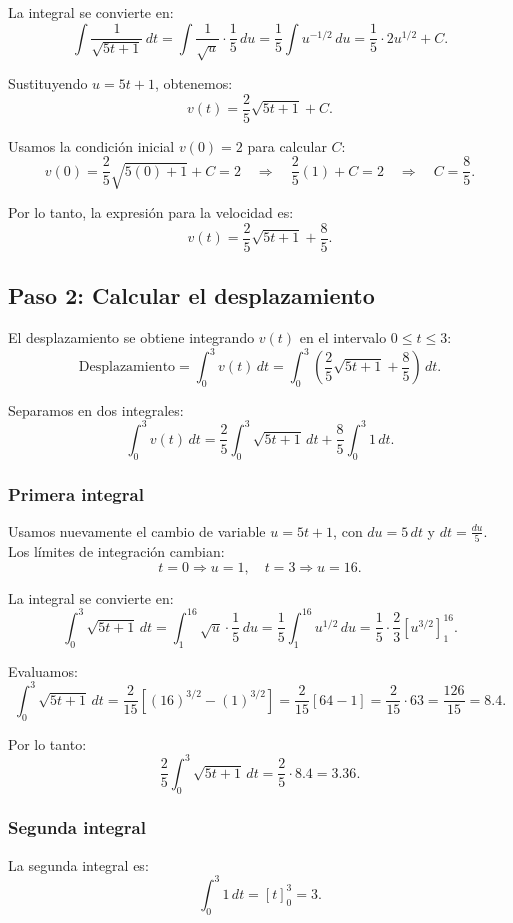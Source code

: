 \documentclass[11pt,letterpaper]{article}
\begin{document}
La integral se convierte en:
\[
\int \frac{1}{\sqrt{5t + 1}} \, dt = \int \frac{1}{\sqrt{u}} \cdot \frac{1}{5} \, du = \frac{1}{5} \int u^{-1/2} \, du = \frac{1}{5} \cdot 2u^{1/2} + C.
\]

Sustituyendo \(u = 5t + 1\), obtenemos:
\[
v(t) = \frac{2}{5} \sqrt{5t + 1} + C.
\]

Usamos la condición inicial \(v(0) = 2\) para calcular \(C\):
\[
v(0) = \frac{2}{5} \sqrt{5(0) + 1} + C = 2 \quad \Rightarrow \quad \frac{2}{5}(1) + C = 2 \quad \Rightarrow \quad C = \frac{8}{5}.
\]

Por lo tanto, la expresión para la velocidad es:
\[
v(t) = \frac{2}{5} \sqrt{5t + 1} + \frac{8}{5}.
\]

\subsection*{Paso 2: Calcular el desplazamiento}

El desplazamiento se obtiene integrando \(v(t)\) en el intervalo \(0 \leq t \leq 3\):
\[
\text{Desplazamiento} = \int_{0}^{3} v(t) \, dt = \int_{0}^{3} \left( \frac{2}{5} \sqrt{5t + 1} + \frac{8}{5} \right) \, dt.
\]

Separamos en dos integrales:
\[
\int_{0}^{3} v(t) \, dt = \frac{2}{5} \int_{0}^{3} \sqrt{5t + 1} \, dt + \frac{8}{5} \int_{0}^{3} 1 \, dt.
\]

\subsubsection*{Primera integral}
Usamos nuevamente el cambio de variable \(u = 5t + 1\), con \(du = 5 \, dt\) y \(dt = \frac{du}{5}\). Los límites de integración cambian:
\[
t = 0 \Rightarrow u = 1, \quad t = 3 \Rightarrow u = 16.
\]

La integral se convierte en:
\[
\int_{0}^{3} \sqrt{5t + 1} \, dt = \int_{1}^{16} \sqrt{u} \cdot \frac{1}{5} \, du = \frac{1}{5} \int_{1}^{16} u^{1/2} \, du = \frac{1}{5} \cdot \frac{2}{3} \left[ u^{3/2} \right]_{1}^{16}.
\]

Evaluamos:
\[
\int_{0}^{3} \sqrt{5t + 1} \, dt = \frac{2}{15} \left[ (16)^{3/2} - (1)^{3/2} \right] = \frac{2}{15} \left[ 64 - 1 \right] = \frac{2}{15} \cdot 63 = \frac{126}{15} = 8.4.
\]

Por lo tanto:
\[
\frac{2}{5} \int_{0}^{3} \sqrt{5t + 1} \, dt = \frac{2}{5} \cdot 8.4 = 3.36.
\]

\subsubsection*{Segunda integral}
La segunda integral es:
\[
\int_{0}^{3} 1 \, dt = [t]_{0}^{3} = 3.
\]
\end{document}

